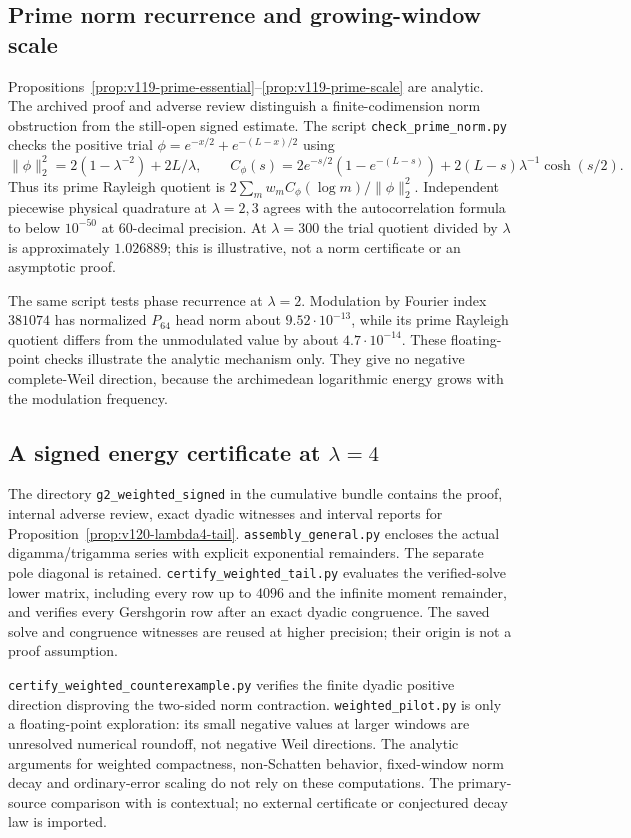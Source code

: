 \documentclass[11pt]{article}
\theoremstyle{remark}
\begin{document}
\subsection*{Prime norm recurrence and growing-window scale}
Propositions~\ref{prop:v119-prime-essential}--\ref{prop:v119-prime-scale}
are analytic. The archived proof and adverse review distinguish a
finite-codimension norm obstruction from the still-open signed estimate.
The script \texttt{check\_prime\_norm.py} checks the positive trial
$\phi=e^{-x/2}+e^{-(L-x)/2}$ using
\[
 \|\phi\|_2^2=2(1-\lambda^{-2})+2L/\lambda,
 \qquad
 C_\phi(s)=2e^{-s/2}(1-e^{-(L-s)})
             +2(L-s)\lambda^{-1}\cosh(s/2).
\]
Thus its prime Rayleigh quotient is
$2\sum_m w_m C_\phi(\log m)/\|\phi\|_2^2$.
Independent piecewise physical quadrature at $\lambda=2,3$ agrees
with the autocorrelation formula to below $10^{-50}$ at 60-decimal
precision. At $\lambda=300$ the trial quotient divided by $\lambda$
is approximately $1.026889$; this is illustrative, not a norm certificate
or an asymptotic proof.

The same script tests phase recurrence at $\lambda=2$. Modulation by
Fourier index $381074$ has normalized $P_{64}$ head norm about
$9.52\cdot10^{-13}$, while its prime Rayleigh quotient differs from
the unmodulated value by about $4.7\cdot10^{-14}$.
These floating-point checks illustrate the analytic mechanism only.
They give no negative complete-Weil direction, because the
archimedean logarithmic energy grows with the modulation frequency.

\subsection*{A signed energy certificate at $\lambda=4$}
The directory \texttt{g2\_weighted\_signed} in the cumulative bundle
contains the proof, internal adverse review, exact dyadic witnesses
and interval reports for Proposition~\ref{prop:v120-lambda4-tail}.
\texttt{assembly\_general.py} encloses the actual digamma/trigamma
series with explicit exponential remainders. The separate pole diagonal
is retained. \texttt{certify\_weighted\_tail.py} evaluates the
verified-solve lower matrix, including every row up to $4096$ and the
infinite moment remainder, and verifies every Gershgorin row after an
exact dyadic congruence. The saved solve and congruence witnesses are
reused at higher precision; their origin is not a proof assumption.

\texttt{certify\_weighted\_counterexample.py} verifies the finite
dyadic positive direction disproving the two-sided norm contraction.
\texttt{weighted\_pilot.py} is only a floating-point exploration:
its small negative values at larger windows are unresolved numerical
roundoff, not negative Weil directions. The analytic arguments for
weighted compactness, non-Schatten behavior, fixed-window norm decay
and ordinary-error scaling do not rely on these computations.
The primary-source comparison with \cite{Zhu2026} is contextual;
no external certificate or conjectured decay law is imported.
\end{document}
